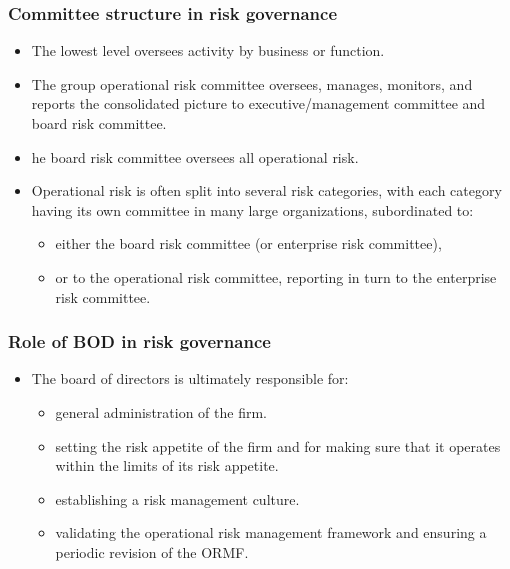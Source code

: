 \subsubsection{Committee structure in risk governance}
\begin{itemize}
\item The lowest level oversees activity by business or function.
\item The group operational risk committee oversees, manages, monitors, and reports the consolidated picture to executive/management committee and board risk committee.
\item he board risk committee oversees all operational risk.
\item Operational risk is often split into several risk categories, with each category having its own committee in many large organizations, subordinated to:
    \begin{itemize}
    \item  either the board risk committee (or enterprise risk committee),
    \item or to the operational risk committee, reporting in turn to the enterprise risk committee.
    \end{itemize}
\end{itemize}


\subsubsection{Role of BOD in risk governance}

\begin{itemize}
\item The board of directors is ultimately responsible for:
    \begin{itemize}
    \item general administration of the firm.
    \item setting the risk appetite of the firm and for making sure that it operates within the limits of its risk appetite.
    \item establishing a risk management culture.
    \item validating the operational risk management framework and ensuring a periodic revision of the ORMF.
    \end{itemize}
\end{itemize}


